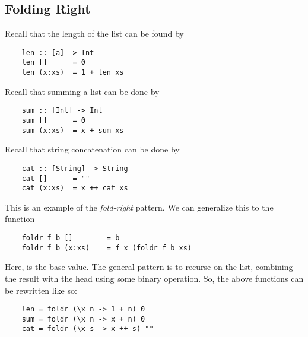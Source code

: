 \documentclass[letterpaper]{article}
\begin{document}
\subsection{Folding Right}
Recall that the length of the list can be found by 
\begin{verbatim}
    len :: [a] -> Int 
    len []      = 0
    len (x:xs)  = 1 + len xs \end{verbatim}
Recall that summing a list can be done by 
\begin{verbatim}
    sum :: [Int] -> Int 
    sum []      = 0
    sum (x:xs)  = x + sum xs \end{verbatim}
Recall that string concatenation can be done by  
\begin{verbatim}
    cat :: [String] -> String 
    cat []      = ""
    cat (x:xs)  = x ++ cat xs \end{verbatim}
This is an example of the \emph{fold-right} pattern. We can generalize this to the function 
\begin{verbatim}
    foldr f b []        = b
    foldr f b (x:xs)    = f x (foldr f b xs)\end{verbatim}
Here,  is the base value. The general pattern is to recurse on the list, combining the result with the head using some binary operation. So, the above functions can be rewritten like so: 
\begin{verbatim}
    len = foldr (\x n -> 1 + n) 0
    sum = foldr (\x n -> x + n) 0 
    cat = foldr (\x s -> x ++ s) ""\end{verbatim}
\end{document}
